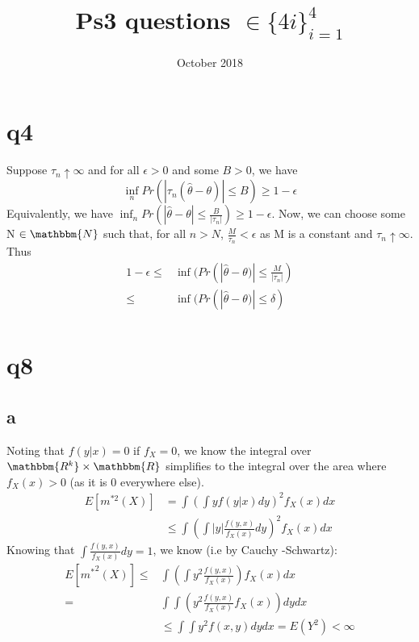 \documentclass{article}
\title{Ps3 questions $\in \{4i\}_{i=1}^4$}
\date{October 2018}
\begin{document}
\maketitle
\section*{q4}
Suppose $\tau_n \uparrow \infty$ and for all $\epsilon>0$ and some $B>0$, we have $$\inf_n Pr(|\tau_n (\hat \theta - \theta)|\leq B) \geq 1-\epsilon $$
Equivalently, we have $\inf_n Pr(|\hat \theta - \theta|\leq \frac{B}{|\tau_n|}) \geq 1-\epsilon$. Now, we can choose some N $\in \mathbbm{N}$ such that, for all $n>N$, $\frac{M}{\tau_n} < \epsilon$ as M is a constant and $\tau_n \uparrow \infty$. Thus
\begin{align*}
    1-\epsilon \leq & \inf(Pr(|\hat \theta - \theta)| \leq \frac{M}{|\tau_n|}) \\
    \leq & \inf(Pr(|\hat \theta - \theta)| \leq \delta) \\
\end{align*}
\section*{q8}
\subsection{a}
Noting that $f(y|x) = 0$ if $f_X = 0$, we know the integral over $\mathbbm{R^k}\times \mathbbm{R}$ simplifies to the integral over the area where $f_X(x)>0$ (as it is 0 everywhere else).
\begin{align*}
    E[m^{*2}(X)] &= \int (\int yf(y|x)dy)^2 f_X(x)dx \\
    & \leq \int (\int |y| \frac{f(y,x)}{f_X(x)}dy)^2 f_X(x)dx
\end{align*}
Knowing that $\int \frac{f(y,x)}{f_X(x)}dy = 1$, we know (i.e by Cauchy -Schwartz):
\begin{align*}
    E[{m^*}^2(X)] \leq & \int (\int y^2 \frac{f(y,x)}{f_X(x)})f_X(x)dx \\
    = & \int \int (y^2 \frac{f(y,x)}{f_X(x)}f_X(x))dy dx \\
    & \leq \int \int y^2 f(x,y) dy dx = E(Y^2) < \infty \\
\end{align*}
\end{document}
